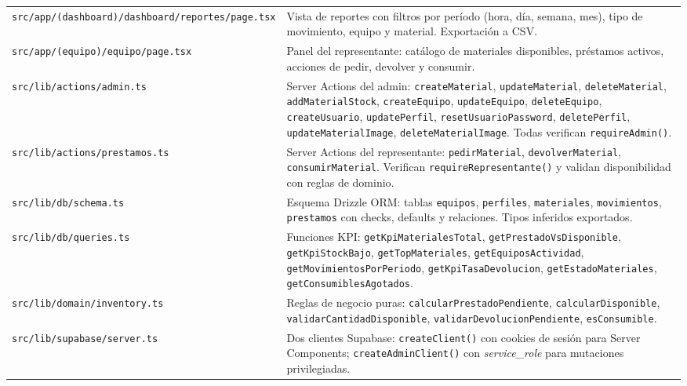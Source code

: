\documentclass[12pt,a4paper,oneside]{report}
\newcommand{\file}[1]{\texttt{\color{cecyteDark}#1}}
\begin{document}
\begin{longtable}{@{}L{5.5cm}L{9.5cm}@{}}
\file{src/app/(dashboard)/dashboard/reportes/page.tsx} &
  Vista de reportes con filtros por período (hora, día, semana, mes), tipo de movimiento, equipo y material. Exportación a CSV. \\

\file{src/app/(equipo)/equipo/page.tsx} &
  Panel del representante: catálogo de materiales disponibles, préstamos activos, acciones de pedir, devolver y consumir. \\

\file{src/lib/actions/admin.ts} &
  Server Actions del admin: \file{createMaterial}, \file{updateMaterial}, \file{deleteMaterial}, \file{addMaterialStock}, \file{createEquipo}, \file{updateEquipo}, \file{deleteEquipo}, \file{createUsuario}, \file{updatePerfil}, \file{resetUsuarioPassword}, \file{deletePerfil}, \file{updateMaterialImage}, \file{deleteMaterialImage}. Todas verifican \file{requireAdmin()}. \\

\file{src/lib/actions/prestamos.ts} &
  Server Actions del representante: \file{pedirMaterial}, \file{devolverMaterial}, \file{consumirMaterial}. Verifican \file{requireRepresentante()} y validan disponibilidad con reglas de dominio. \\

\file{src/lib/db/schema.ts} &
  Esquema Drizzle ORM: tablas \file{equipos}, \file{perfiles}, \file{materiales}, \file{movimientos}, \file{prestamos} con checks, defaults y relaciones. Tipos inferidos exportados. \\

\file{src/lib/db/queries.ts} &
  Funciones KPI: \file{getKpiMaterialesTotal}, \file{getPrestadoVsDisponible}, \file{getKpiStockBajo}, \file{getTopMateriales}, \file{getEquiposActividad}, \file{getMovimientosPorPeriodo}, \file{getKpiTasaDevolucion}, \file{getEstadoMateriales}, \file{getConsumiblesAgotados}. \\

\file{src/lib/domain/inventory.ts} &
  Reglas de negocio puras: \file{calcularPrestadoPendiente}, \file{calcularDisponible}, \file{validarCantidadDisponible}, \file{validarDevolucionPendiente}, \file{esConsumible}. \\

\file{src/lib/supabase/server.ts} &
  Dos clientes Supabase: \file{createClient()} con cookies de sesión para Server Components; \file{createAdminClient()} con \textit{service\_role} para mutaciones privilegiadas. \\


\end{longtable}
\end{document}

